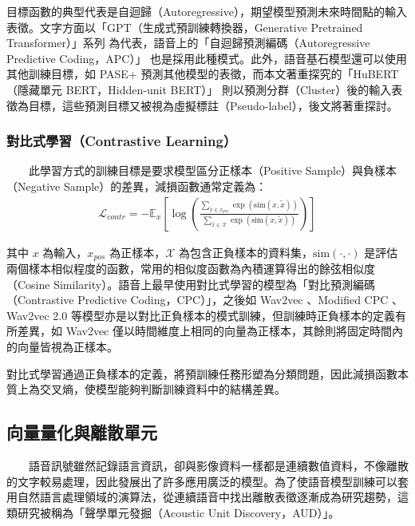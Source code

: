         目標函數的典型代表是自迴歸（Autoregressive），期望模型預測未來時間點的輸入表徵。文字方面以「GPT（生成式預訓練轉換器，Generative Pretrained Transformer）」系列 \cite{radford_language_nodate, brown_language_2020} 為代表，語音上的「自迴歸預測編碼（Autoregressive Predictive Coding，APC）」 \cite{chung_generative_2020} 也是採用此種模式。此外，語音基石模型還可以使用其他訓練目標，如 PASE+ \cite{ravanelli_multi-task_2020} 預測其他模型的表徵，而本文著重探究的「HuBERT（隱藏單元 BERT，Hidden-unit BERT）」\cite{hsu_hubert_2021, hsu_hubert_2021-2} 則以預測分群（Cluster）後的輸入表徵為目標，這些預測目標又被視為虛擬標註（Pseudo-label），後文將著重探討。

\subsubsection{對比式學習（Contrastive Learning）}

　　此學習方式的訓練目標是要求模型區分正樣本（Positive Sample）與負樣本（Negative Sample）的差異，減損函數通常定義為：
\begin{align}
    \mathcal{L}_{contr} = -\mathbb{E}_x\left[\log
        \left(
        {\frac
            {\sum_{\tilde{x} \in x_{pos}}\exp(\text{sim}(x, \tilde{x}))}
            {\sum_{\tilde{x} \in \mathcal{X}}\exp(\text{sim}(x, \tilde{x}))}
        }\right)\right]
\end{align}

        其中 $x$ 為輸入，$x_{pos}$ 為正樣本，$\mathcal{X}$ 為包含正負樣本的資料集，$\text{sim}(\cdot, \cdot)$ 是評估兩個樣本相似程度的函數，常用的相似度函數為內積運算得出的餘弦相似度（Cosine Similarity）。語音上最早使用對比式學習的模型為「對比預測編碼（Contrastive Predictive Coding，CPC）」\cite{maekaku2022speech}，之後如 Wav2vec \cite{schneider2019wav2vec}、Modified CPC \cite{rivière2020unsupervised}、Wav2vec 2.0 \cite{baevski2020wav2vec} 等模型亦是以對比正負樣本的模式訓練，但訓練時正負樣本的定義有所差異，如 Wav2vec 僅以時間維度上相同的向量為正樣本，其餘則將固定時間內的向量皆視為正樣本。

        對比式學習通過正負樣本的定義，將預訓練任務形塑為分類問題，因此減損函數本質上為交叉熵，使模型能夠判斷訓練資料中的結構差異。

\subsection{向量量化與離散單元}

　　語音訊號雖然記錄語言資訊，卻與影像資料一樣都是連續數值資料，不像離散的文字較易處理，因此發展出了許多應用廣泛的模型。為了使語音模型訓練可以套用自然語言處理領域的演算法，從連續語音中找出離散表徵逐漸成為研究趨勢，這類研究被稱為「聲學單元發掘（Acoustic Unit Discovery，AUD）」。

